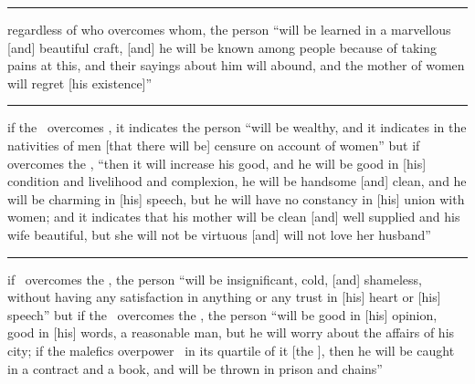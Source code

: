 \begin{description}[style=multiline,leftmargin=1.5cm]
\vspace{0.5em}\hrule
\item[\Mercury\Square\Venus] regardless of who overcomes whom, the person ``will be learned in a marvellous [and] beautiful craft, [and] he will be known among people because of taking pains at this, and their sayings about him will abound, and the mother of women will regret [his existence]''

\vspace{0.5em}\hrule
\item[\Moon\Square\Venus] if the \Moon\, overcomes \Venus, it indicates the person ``will be wealthy, and it indicates in the nativities of men [that there will be] censure on account of women'' but if \Venus\, overcomes the \Moon, ``then it will increase his good, and he will be good in [his] condition and livelihood and complexion, he will be handsome [and] clean, and he will be charming in [his] speech, but he will have no constancy in [his] union with women; and it indicates that his mother will be clean [and] well supplied and his wife beautiful, but she will not be virtuous [and] will not love her husband''

\vspace{0.5em}\hrule
\item[\Mercury\Square\Moon] if \Mercury\, overcomes the \Moon, the person ``will be insignificant, cold, [and] shameless, without having any satisfaction in anything or any trust in [his] heart or [his] speech''  but if the \Moon\, overcomes the \Mercury, the person ``will be good in [his] opinion, good in [his] words, a reasonable man, but he will worry about the affairs of his city; if the malefics overpower \Mercury\, in its quartile of it [the \Moon], then he will be caught in a contract and a book, and will be thrown in prison and chains'' 
\end{description}